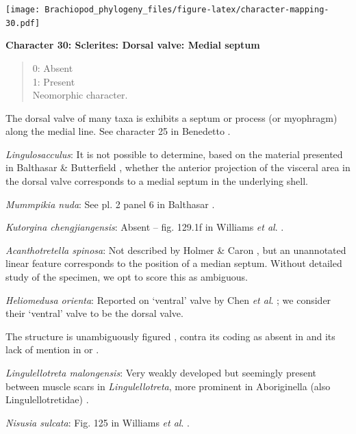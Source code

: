 \documentclass[]{book}
\theoremstyle{definition}
\theoremstyle{definition}
\theoremstyle{definition}
\theoremstyle{remark}
\begin{document}
\texttt{[image: Brachiopod\_phylogeny\_files/figure-latex/character-mapping-30.pdf]}

\textbf{Character 30: Sclerites: Dorsal valve: Medial septum}

\begin{quote}
0: Absent\\
1: Present\\
Neomorphic character.
\end{quote}

The dorsal valve of many taxa is exhibits a septum or process (or
myophragm) along the medial line. See character 25 in Benedetto
\citeyearpar{Benedetto2009iChaniella}.

\emph{Lingulosacculus}: It is not possible to determine, based on the
material presented in Balthasar \& Butterfield
\citeyearpar{Balthasar2009EarlyCambrian}, whether the anterior
projection of the visceral area in the dorsal valve corresponds to a
medial septum in the underlying shell.

\emph{Mummpikia nuda}: See pl. 2 panel 6 in Balthasar
\citeyearpar{Balthasar2008iMummpikia}.

\emph{Kutorgina chengjiangensis}: Absent -- fig. 129.1f in Williams
\emph{et al}. \citeyearpar{Williams2000BrachiopodaLinguliformea}.

\emph{Acanthotretella spinosa}: Not described by Holmer \& Caron
\citeyearpar{Holmer2006Aspinose}, but an unannotated linear feature
corresponds to the position of a median septum. Without detailed study
of the specimen, we opt to score this as ambiguous.

\emph{Heliomedusa orienta}: Reported on `ventral' valve by Chen \emph{et
al}. \citeyearpar{Chen2007Reinterpretationof}; we consider their
`ventral' valve to be the dorsal valve.

The structure is unambiguously figured \citep[e.g.~fig. 5.1
in][]{Chen2007Reinterpretationof}, contra its coding as absent in
\citet{Williams2000BrachiopodaLinguliformea} and its lack of mention in
\citet{Williams2007PartH} or \citet{Zhang2009Architectureand}.

\emph{Lingulellotreta malongensis}: Very weakly developed but seemingly
present between muscle scars in \emph{Lingulellotreta}, more prominent
in Aboriginella (also Lingulellotretidae) \citep[fig.
34]{Williams2000BrachiopodaLinguliformea}.

\emph{Nisusia sulcata}: Fig. 125 in Williams \emph{et al}.
\citeyearpar{Williams2000BrachiopodaLinguliformea}.
\end{document}

